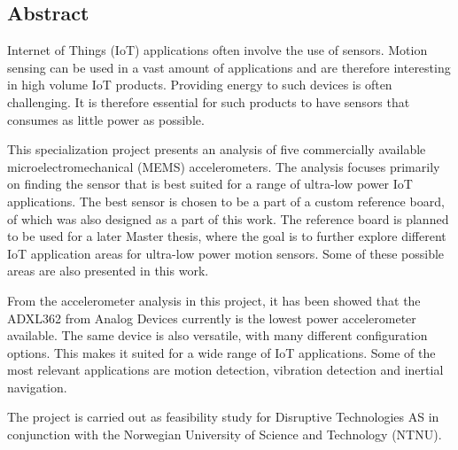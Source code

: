 \begin{center}
\section*{Abstract}
\end{center}

Internet of Things (IoT) applications often involve the use of sensors. Motion sensing can be used in a vast amount of applications and are therefore interesting in high volume IoT products. Providing energy to such devices is often challenging. It is therefore essential for such products to have sensors that consumes as little power as possible. 

This specialization project presents an analysis of five commercially available microelectromechanical (MEMS) accelerometers. The analysis focuses primarily on finding the sensor that is best suited for a range of ultra-low power IoT applications. The best sensor is chosen to be a part of a custom reference board, of which was also designed as a part of this work. The reference board is planned to be used for a later Master thesis, where the goal is to further explore different IoT application areas for ultra-low power motion sensors. Some of these possible areas are also presented in this work. 

From the accelerometer analysis in this project, it has been showed that the ADXL362 from Analog Devices currently is the lowest power accelerometer available. The same device is also versatile, with many different configuration options. This makes it suited for a wide range of IoT applications. Some of the most relevant applications are motion detection, vibration detection and inertial navigation.  

The project is carried out as feasibility study for Disruptive Technologies AS in conjunction with the Norwegian University of Science and Technology (NTNU).